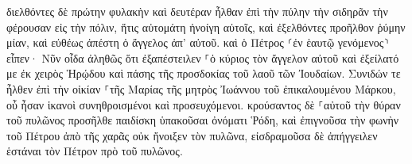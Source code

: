 \documentclass{openreader}
\begin{document}
διελθόντες δὲ πρώτην φυλακὴν καὶ δευτέραν ἦλθαν ἐπὶ τὴν πύλην τὴν σιδηρᾶν τὴν φέρουσαν εἰς τὴν πόλιν, ἥτις αὐτομάτη ἠνοίγη αὐτοῖς, καὶ ἐξελθόντες προῆλθον ῥύμην μίαν, καὶ εὐθέως ἀπέστη ὁ ἄγγελος ἀπ’ αὐτοῦ. 
καὶ ὁ Πέτρος ⸂ἐν ἑαυτῷ γενόμενος⸃ εἶπεν· Νῦν οἶδα ἀληθῶς ὅτι ἐξαπέστειλεν ⸀ὁ κύριος τὸν ἄγγελον αὐτοῦ καὶ ἐξείλατό με ἐκ χειρὸς Ἡρῴδου καὶ πάσης τῆς προσδοκίας τοῦ λαοῦ τῶν Ἰουδαίων. 
Συνιδών τε ἦλθεν ἐπὶ τὴν οἰκίαν ⸀τῆς Μαρίας τῆς μητρὸς Ἰωάννου τοῦ ἐπικαλουμένου Μάρκου, οὗ ἦσαν ἱκανοὶ συνηθροισμένοι καὶ προσευχόμενοι. 
κρούσαντος δὲ ⸀αὐτοῦ τὴν θύραν τοῦ πυλῶνος προσῆλθε παιδίσκη ὑπακοῦσαι ὀνόματι Ῥόδη, 
καὶ ἐπιγνοῦσα τὴν φωνὴν τοῦ Πέτρου ἀπὸ τῆς χαρᾶς οὐκ ἤνοιξεν τὸν πυλῶνα, εἰσδραμοῦσα δὲ ἀπήγγειλεν ἑστάναι τὸν Πέτρον πρὸ τοῦ πυλῶνος. 
\end{document}
